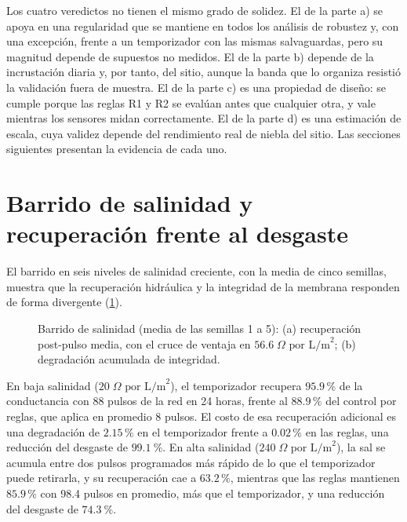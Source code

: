 Los cuatro veredictos no tienen el mismo grado de solidez. El de la parte a) se apoya en una regularidad que se mantiene en todos los an\'alisis de robustez y, con una excepci\'on, frente a un temporizador con las mismas salvaguardas, pero su magnitud depende de supuestos no medidos. El de la parte b) depende de la incrustaci\'on diaria y, por tanto, del sitio, aunque la banda que lo organiza resisti\'o la validaci\'on fuera de muestra. El de la parte c) es una propiedad de dise\~no: se cumple porque las reglas R1 y R2 se eval\'uan antes que cualquier otra, y vale mientras los sensores midan correctamente. El de la parte d) es una estimaci\'on de escala, cuya validez depende del rendimiento real de niebla del sitio. Las secciones siguientes presentan la evidencia de cada uno.

\section{Barrido de salinidad y recuperaci\'on frente al desgaste}
El barrido en seis niveles de salinidad creciente, con la media de cinco semillas, muestra que la recuperaci\'on hidr\'aulica y la integridad de la membrana responden de forma divergente (\cref{fig:barrido_salinidad}).

\begin{figure}[htbp]
\centering

\caption{Barrido de salinidad (media de las semillas 1 a 5): (a) recuperaci\'on post-pulso media, con el cruce de ventaja en $56.6\;\Omega\text{ por L/m}^2$; (b) degradaci\'on acumulada de integridad.}
\label{fig:barrido_salinidad}
\end{figure}

En baja salinidad ($20\;\Omega\text{ por L/m}^2$), el temporizador recupera $95.9\,\%$ de la conductancia con 88 pulsos de la red en 24 horas, frente al $88.9\,\%$ del control por reglas, que aplica en promedio 8 pulsos. El costo de esa recuperaci\'on adicional es una degradaci\'on de $2.15\,\%$ en el temporizador frente a $0.02\,\%$ en las reglas, una reducci\'on del desgaste de $\SI{99.1}{\percent}$. En alta salinidad ($240\;\Omega\text{ por L/m}^2$), la sal se acumula entre dos pulsos programados m\'as r\'apido de lo que el temporizador puede retirarla, y su recuperaci\'on cae a $63.2\,\%$, mientras que las reglas mantienen $85.9\,\%$ con 98.4 pulsos en promedio, m\'as que el temporizador, y una reducci\'on del desgaste de $\SI{74.3}{\percent}$.


